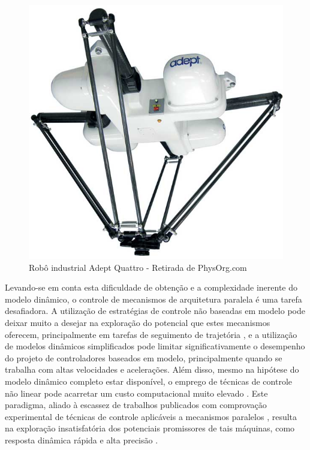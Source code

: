 \documentclass[]{politex}
\begin{document}
\begin{figure}[h]
	\centering
	\includegraphics[scale=0.17]{../figures/theadeptquat.jpg}  
	\caption{Robô industrial Adept Quattro - Retirada de PhysOrg.com}
	\label{fig:Mecanismo}
\end{figure}

Levando-se em conta esta dificuldade de obtenção e a complexidade inerente do modelo dinâmico, o controle de mecanismos de arquitetura paralela é uma tarefa desafiadora. A utilização de estratégias de controle não baseadas em modelo pode deixar muito a desejar na exploração do potencial que estes mecanismos oferecem, principalmente em tarefas de seguimento de trajetória \cite{Chung}, e a utilização de modelos dinâmicos simplificados pode limitar significativamente o desempenho do projeto de controladores baseados em modelo, principalmente quando se trabalha com altas velocidades e acelerações. Além disso, mesmo na hipótese do modelo dinâmico completo estar disponível, o emprego de técnicas de controle não linear pode acarretar um custo  computacional muito elevado \cite{Craig, Slotini, Zubizarreta, Zubizarreta3}. Este paradigma, aliado à escassez de trabalhos publicados com comprovação experimental de técnicas de controle aplicáveis a mecanismos paralelos \cite{Rynaldo}, resulta na exploração insatisfatória dos potenciais promissores de tais máquinas, como resposta dinâmica rápida e alta precisão \cite{Abdellatif}.
	
\end{document}
